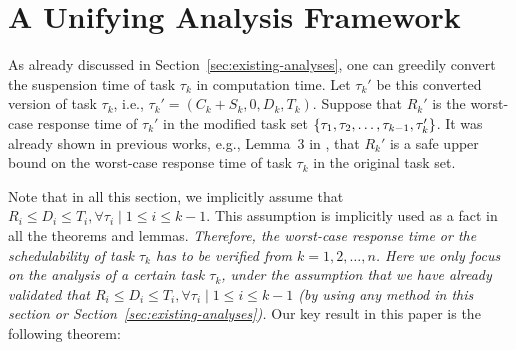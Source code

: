 \section{A Unifying Analysis Framework}
\label{sec:analysis}


 \begin{table*}[t]
    \centering
    \renewcommand{\arraystretch}{1.7}
    \caption{Detailed procedure in Example~\ref{ex:general_framework} for deriving the upper bound of $R_3$, with $R_1-C_1=5$ and $R_2-C_2=9$.}
    \label{tab:example3-calculation}
  \end{table*}


As already discussed in Section~\ref{sec:existing-analyses}, one can greedily convert the suspension time of task $\tau_k$ in computation time. Let $\tau_k'$ be this converted version of task $\tau_k$, i.e., $\tau_k' = (C_k + S_k, 0, D_k, T_k)$.  Suppose that $R_k'$ is the worst-case response time of $\tau_k'$ in the modified task set $\left\{{\tau_1, \tau_2, \ldots, \tau_{k-1}, \tau_k'}\right\}$. It was already shown in previous works, e.g., Lemma~3 in
\cite{Liu_2014}, that $R_k'$ is a safe upper bound on the worst-case response time of task $\tau_k$ in the original task set.

Note that in all this section, we implicitly assume that $R_i
\leq D_i \leq T_i, \forall \tau_i \mid 1 \leq i \leq k-1$.  This assumption is implicitly used as a fact in all the theorems and lemmas. \emph{Therefore, the worst-case response time or the schedulability of task $\tau_k$ has to be verified from $k=1,2,\ldots, n$. Here we only focus on the analysis of a certain task $\tau_k$, under the assumption that we have already validated that $R_i
\leq D_i \leq T_i, \forall \tau_i \mid 1 \leq i \leq k-1$ (by using any method in this section or Section~\ref{sec:existing-analyses}). } 
Our key result in
this paper is the following theorem:

